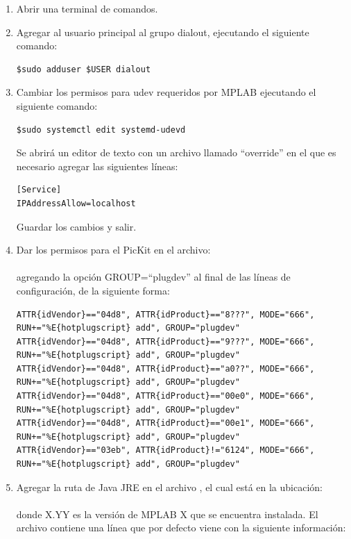 \documentclass[a4paper,12pt]{refart}
\begin{document}
\begin{enumerate}
\item Abrir una terminal de comandos.

\item Agregar al usuario principal al grupo dialout, ejecutando el siguiente comando:

\begin{lstlisting}
$sudo adduser $USER dialout
\end{lstlisting}

\item Cambiar los permisos para udev requeridos por MPLAB ejecutando el siguiente comando:
\begin{lstlisting}
$sudo systemctl edit systemd-udevd
\end{lstlisting}

Se abrirá un editor de texto con un archivo llamado ``override'' en el que es necesario agregar las siguientes líneas:

\begin{lstlisting}
[Service]
IPAddressAllow=localhost
\end{lstlisting}

Guardar los cambios y salir.

\item Dar los permisos para el PicKit en el archivo:
\\
\\
agregando la opción GROUP=``plugdev'' al final de las líneas de configuración, de la siguiente forma:

\begin{lstlisting}
ATTR{idVendor}=="04d8", ATTR{idProduct}=="8???", MODE="666", RUN+="%E{hotplugscript} add", GROUP="plugdev"
ATTR{idVendor}=="04d8", ATTR{idProduct}=="9???", MODE="666", RUN+="%E{hotplugscript} add", GROUP="plugdev"
ATTR{idVendor}=="04d8", ATTR{idProduct}=="a0??", MODE="666", RUN+="%E{hotplugscript} add", GROUP="plugdev"
ATTR{idVendor}=="04d8", ATTR{idProduct}=="00e0", MODE="666", RUN+="%E{hotplugscript} add", GROUP="plugdev"
ATTR{idVendor}=="04d8", ATTR{idProduct}=="00e1", MODE="666", RUN+="%E{hotplugscript} add", GROUP="plugdev"
ATTR{idVendor}=="03eb", ATTR{idProduct}!="6124", MODE="666", RUN+="%E{hotplugscript} add", GROUP="plugdev"
\end{lstlisting}

\item Agregar la ruta de Java JRE en el archivo , el cual está en la ubicación:
\\
\\
donde X.YY es la versión de MPLAB X que se encuentra instalada. El archivo contiene una línea que por defecto viene con la siguiente información:


\end{enumerate}
\end{document}
